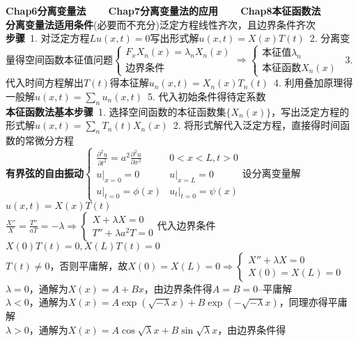 \documentclass[10pt,a4paper]{article}
\begin{document}
\begin{multicols}{2}
\textbf{Chap6分离变量法~~~~Chap7分离变量法的应用~~~~Chap8本征函数法}\\
\tiny\textbf{分离变量法适用条件}(必要而不充分)泛定方程线性齐次，且边界条件齐次\\
\textbf{步骤}~1. 对泛定方程$Lu(x,t)=0$写出形式解$u(x,t)=X(x)T(t)$~2. 分离变量得空间函数本征值问题$\left\{\begin{array}{l}F_xX_n(x)=\lambda_nX_n(x)\\\text{边界条件}\end{array}\right.\Longrightarrow\left\{\begin{array}{l}\text{本征值}\lambda_n\\\text{本征函数}X_n(x)\end{array}\right.$~3. 代入时间方程解出$T(t)$得本征解$u_n(x,t)=X_n(x)T_n(t)$~4. 利用叠加原理得一般解$u(x,t)=\sum_nu_n(x,t)$~5. 代入初始条件得待定系数\\
\textbf{本征函数法基本步骤}~1. 选择空间函数的本征函数集$\{X_n(x)\}$，写出泛定方程的形式解$u(x,t)=\sum_nT_n(t)X_n(x)$~2. 将形式解代入泛定方程，直接得时间函数的常微分方程\\
\textbf{有界弦的自由振动}$\left\{\begin{array}{ll}\frac{\partial^2u}{\partial t^2}=a^2\frac{\partial^2u}{\partial x^2}&0<x<L,t>0\\u|_{x=0}=0&u|_{x=L}=0\\u|_{t=0}=\phi(x)&u_t|_{t=0}=\psi(x)\end{array}\right.$设分离变量解$u(x,t)=X(x)T(t)$\\
$\frac{X''}{X}=\frac{T''}{aT}=-\lambda\Longrightarrow\left\{\begin{array}{l}X+\lambda X=0\\T''+\lambda a^2T=0\end{array}\right.$代入边界条件$X(0)T(t)=0,X(L)T(t)=0$\\
$T(t)\neq0$，否则平庸解，故$X(0)=X(L)=0\Longrightarrow\left\{\begin{array}{ll}X''+\lambda X=0\\X(0)=X(L)=0\end{array}\right.$\\
$\lambda=0$，通解为$X(x)=A+Bx$，由边界条件得$A=B=0$--平庸解\\
$\lambda<0$，通解为$X(x)=A\exp(\sqrt{-\lambda}x)+B\exp(-\sqrt{-\lambda}x)$，同理亦得平庸解\\
$\lambda>0$，通解为$X(x)=A\cos\sqrt{\lambda}x+B\sin\sqrt{\lambda}x$，由边界条件得\\

\end{multicols}
\end{document}
